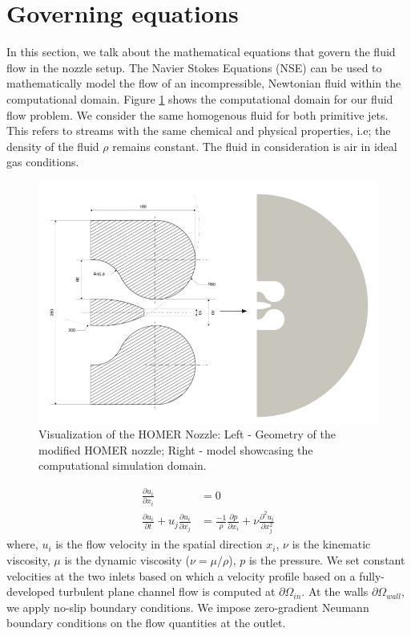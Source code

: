 \section{Governing equations} \label{goveq}
In this section, we talk about the mathematical equations that govern the fluid flow in the nozzle setup. The Navier Stokes Equations (NSE) can be used to mathematically model the flow of an incompressible, Newtonian fluid within the computational domain. Figure \ref{fig:Domain} shows the computational domain for our fluid flow problem. We consider the same homogenous fluid for both primitive jets. This refers to streams with the same chemical and physical properties, i.e; the density of the fluid $\rho$ remains constant. The fluid in consideration is air in ideal gas conditions. 
\begin{figure}[ht]
  \centering
  \includegraphics[width=12cm]{images/Theory-CFD/Flow Domain.png}
  \caption{Visualization of the HOMER Nozzle: Left - Geometry of the modified HOMER nozzle; Right -  model showcasing the computational simulation domain.}
  \label{fig:Domain}
\end{figure}
\begin{equation}
  \begin{aligned}
  \frac{\partial u_i}{\partial x_i}&=0\\
  \frac{\partial u_i}{\partial t}+u_j \frac{\partial u_i}{\partial x_j}&=\frac{-1}{\rho} \frac{\partial p}{\partial x_i}+\nu \frac{\partial^2 u_i}{\partial x_j^2}
  \end{aligned}
  \end{equation}
where, $u_i$ is the flow velocity in the spatial direction $x_i$, $\nu$ is the kinematic viscosity, $\mu$ is the dynamic viscosity ($\nu = \mu / \rho$), $p$ is the pressure. We set constant velocities at the two inlets based on which a velocity profile based on a fully-developed turbulent plane channel flow is computed at $\partial{\Omega_{in}}$. At the walls $\partial{\Omega_{wall}}$, we apply no-slip boundary conditions. We impose zero-gradient Neumann boundary conditions on the flow quantities at the outlet.\\
